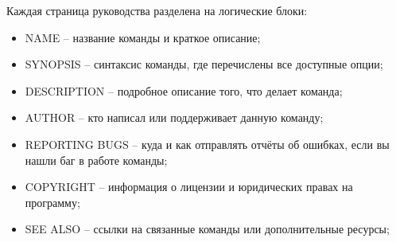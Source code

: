 \documentclass[14pt]{extreport}
\begin{document}
{Каждая страница руководства разделена на логические блоки:
\begin{itemize}
    \item NAME -- название команды и краткое описание;
    \item SYNOPSIS -- синтаксис команды, где перечислены все доступные опции;
    \item DESCRIPTION -- подробное описание того, что делает команда;
    \item AUTHOR -- кто написал или поддерживает данную команду;
    \item REPORTING BUGS -- куда и как отправлять отчёты об ошибках, если вы нашли баг в работе команды;
    \item COPYRIGHT -- информация о лицензии и юридических правах на программу;
    \item SEE ALSO -- ссылки на связанные команды или дополнительные ресурсы;
\end{itemize}

}
\end{document}
